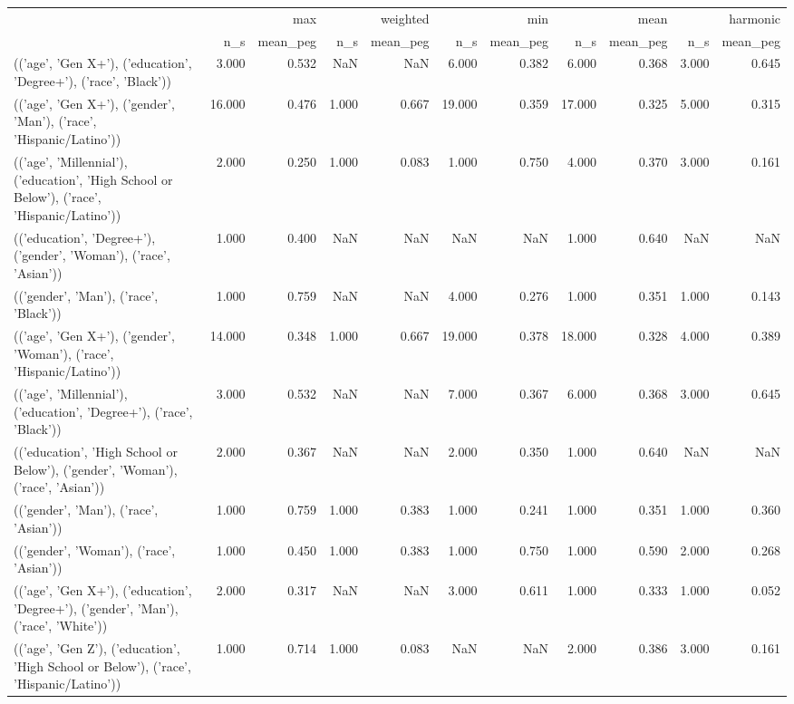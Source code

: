 \begin{tabular}{lrrrrrrrrrr}
\toprule
 & \multicolumn{2}{r}{max} & \multicolumn{2}{r}{weighted} & \multicolumn{2}{r}{min} & \multicolumn{2}{r}{mean} & \multicolumn{2}{r}{harmonic} \\
 & n_s & mean_peg & n_s & mean_peg & n_s & mean_peg & n_s & mean_peg & n_s & mean_peg \\
\midrule
(('age', 'Gen X+'), ('education', 'Degree+'), ('race', 'Black')) & 3.000 & 0.532 & NaN & NaN & 6.000 & 0.382 & 6.000 & 0.368 & 3.000 & 0.645 \\
(('age', 'Gen X+'), ('gender', 'Man'), ('race', 'Hispanic/Latino')) & 16.000 & 0.476 & 1.000 & 0.667 & 19.000 & 0.359 & 17.000 & 0.325 & 5.000 & 0.315 \\
(('age', 'Millennial'), ('education', 'High School or Below'), ('race', 'Hispanic/Latino')) & 2.000 & 0.250 & 1.000 & 0.083 & 1.000 & 0.750 & 4.000 & 0.370 & 3.000 & 0.161 \\
(('education', 'Degree+'), ('gender', 'Woman'), ('race', 'Asian')) & 1.000 & 0.400 & NaN & NaN & NaN & NaN & 1.000 & 0.640 & NaN & NaN \\
(('gender', 'Man'), ('race', 'Black')) & 1.000 & 0.759 & NaN & NaN & 4.000 & 0.276 & 1.000 & 0.351 & 1.000 & 0.143 \\
(('age', 'Gen X+'), ('gender', 'Woman'), ('race', 'Hispanic/Latino')) & 14.000 & 0.348 & 1.000 & 0.667 & 19.000 & 0.378 & 18.000 & 0.328 & 4.000 & 0.389 \\
(('age', 'Millennial'), ('education', 'Degree+'), ('race', 'Black')) & 3.000 & 0.532 & NaN & NaN & 7.000 & 0.367 & 6.000 & 0.368 & 3.000 & 0.645 \\
(('education', 'High School or Below'), ('gender', 'Woman'), ('race', 'Asian')) & 2.000 & 0.367 & NaN & NaN & 2.000 & 0.350 & 1.000 & 0.640 & NaN & NaN \\
(('gender', 'Man'), ('race', 'Asian')) & 1.000 & 0.759 & 1.000 & 0.383 & 1.000 & 0.241 & 1.000 & 0.351 & 1.000 & 0.360 \\
(('gender', 'Woman'), ('race', 'Asian')) & 1.000 & 0.450 & 1.000 & 0.383 & 1.000 & 0.750 & 1.000 & 0.590 & 2.000 & 0.268 \\
(('age', 'Gen X+'), ('education', 'Degree+'), ('gender', 'Man'), ('race', 'White')) & 2.000 & 0.317 & NaN & NaN & 3.000 & 0.611 & 1.000 & 0.333 & 1.000 & 0.052 \\
(('age', 'Gen Z'), ('education', 'High School or Below'), ('race', 'Hispanic/Latino')) & 1.000 & 0.714 & 1.000 & 0.083 & NaN & NaN & 2.000 & 0.386 & 3.000 & 0.161 \\

\end{tabular}
